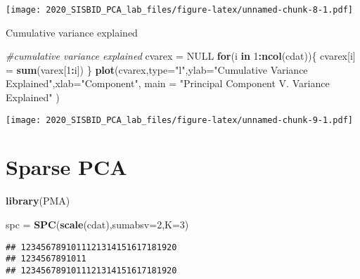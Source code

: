 \documentclass[
]{article}
\newenvironment{Shaded}{\begin{snugshade}}{\end{snugshade}}
\newcommand{\CommentTok}[1]{\textcolor[rgb]{0.56,0.35,0.01}{\textit{#1}}}
\newcommand{\ControlFlowTok}[1]{\textcolor[rgb]{0.13,0.29,0.53}{\textbf{#1}}}
\newcommand{\DataTypeTok}[1]{\textcolor[rgb]{0.13,0.29,0.53}{#1}}
\newcommand{\DecValTok}[1]{\textcolor[rgb]{0.00,0.00,0.81}{#1}}
\newcommand{\KeywordTok}[1]{\textcolor[rgb]{0.13,0.29,0.53}{\textbf{#1}}}
\newcommand{\NormalTok}[1]{#1}
\newcommand{\OperatorTok}[1]{\textcolor[rgb]{0.81,0.36,0.00}{\textbf{#1}}}
\newcommand{\OtherTok}[1]{\textcolor[rgb]{0.56,0.35,0.01}{#1}}
\newcommand{\StringTok}[1]{\textcolor[rgb]{0.31,0.60,0.02}{#1}}
\begin{document}
\texttt{[image: 2020\_SISBID\_PCA\_lab\_files/figure-latex/unnamed-chunk-8-1.pdf]}

Cumulative variance explained

\begin{Shaded}
\begin{Highlighting}[]
\CommentTok{#cumulative variance explained}
\NormalTok{cvarex =}\StringTok{ }\OtherTok{NULL}
\ControlFlowTok{for}\NormalTok{(i }\ControlFlowTok{in} \DecValTok{1}\OperatorTok{:}\KeywordTok{ncol}\NormalTok{(cdat))\{}
\NormalTok{  cvarex[i] =}\StringTok{ }\KeywordTok{sum}\NormalTok{(varex[}\DecValTok{1}\OperatorTok{:}\NormalTok{i])}
\NormalTok{\}}
\KeywordTok{plot}\NormalTok{(cvarex,}\DataTypeTok{type=}\StringTok{"l"}\NormalTok{,}\DataTypeTok{ylab=}\StringTok{"Cumulative Variance Explained"}\NormalTok{,}\DataTypeTok{xlab=}\StringTok{"Component"}\NormalTok{, }\DataTypeTok{main =} \StringTok{"Principal Component V. Variance Explained"}\NormalTok{ )}
\end{Highlighting}
\end{Shaded}

\texttt{[image: 2020\_SISBID\_PCA\_lab\_files/figure-latex/unnamed-chunk-9-1.pdf]}

\hypertarget{sparse-pca}{%
\section{Sparse PCA}\label{sparse-pca}}

\begin{Shaded}
\begin{Highlighting}[]
\KeywordTok{library}\NormalTok{(PMA)}

\NormalTok{spc =}\StringTok{ }\KeywordTok{SPC}\NormalTok{(}\KeywordTok{scale}\NormalTok{(cdat),}\DataTypeTok{sumabsv=}\DecValTok{2}\NormalTok{,}\DataTypeTok{K=}\DecValTok{3}\NormalTok{)}
\end{Highlighting}
\end{Shaded}

\begin{verbatim}
## 1234567891011121314151617181920
## 1234567891011
## 1234567891011121314151617181920
\end{verbatim}

\begin{Shaded}
\end{Shaded}
\end{document}
